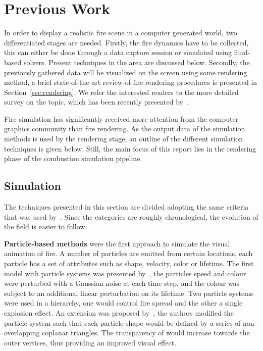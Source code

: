 \chapter{Previous Work}
\label{ch:previous_work}

In order to display a realistic fire scene in a computer generated world, two differentiated stages are needed.
Firstly, the fire dynamics have to be collected, this can either be done through a data capture session or simulated using fluid-based solvers.
Present techniques in the area are discussed below. 
Secondly, the previously gathered data will be visualized on the screen using some rendering method, a brief state-of-the-art review of fire rendering procedures is presented in Section~\ref{sec:rendering}.
We refer the interested readers to the more detailed survey on the topic, which has been recently presented by~\cite{Huang:2014}.

Fire simulation has significantly received more attention from the computer graphics community than fire rendering.
As the output data of the simulation methods is used by the rendering stage, an outline of the different simulation techniques is given below. 
Still, the main focus of this report lies in the rendering phase of the combustion simulation pipeline.

\section{Simulation}
\label{sec:simulation}


The techniques presented in this section are divided adopting the same criteria that was used by~\cite{Huang:2014}.
Since the categories are roughly chronological, the evolution of the field is easier to follow.

\textbf{Particle-based methods} were the first approach to simulate the visual animation of fire.
A number of particles are emitted from certain locations, each particle has a set of attributes such as shape, velocity, color or lifetime.
The first model with particle systems was presented by~\cite{Reeves:1983}, the particles speed and colour were perturbed with a Gaussian noise at each time step, and the colour was subject to an additional linear perturbation on its lifetime.
Two particle systems were used in a hierarchy, one would control fire spread and the other a single explosion effect.
An extension was proposed by~\cite{Perry:1994}, the authors modified the particle system such that each particle shape would be defined by a series of non-overlapping coplanar triangles.
The transparency of would increase towards the outer vertices, thus providing an improved visual effect.



